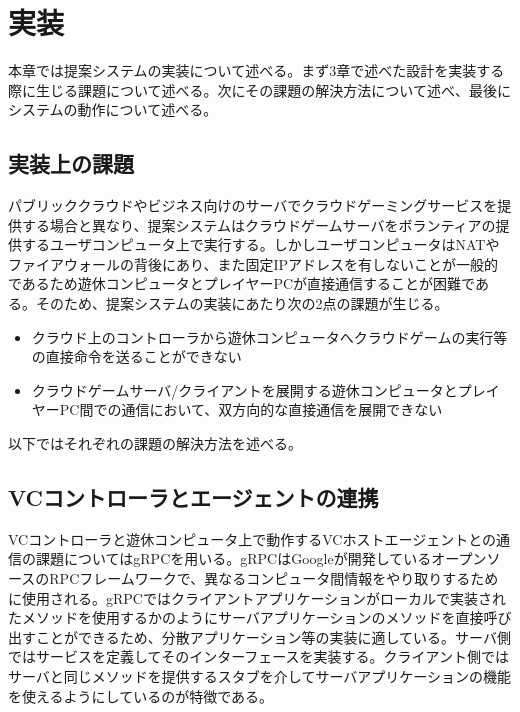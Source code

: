 \section{実装}
本章では提案システムの実装について述べる。まず3章で述べた設計を実装する際に生じる課題について述べる。次にその課題の解決方法について述べ、最後にシステムの動作について述べる。


\subsection{実装上の課題}
パブリッククラウドやビジネス向けのサーバでクラウドゲーミングサービスを提供する場合と異なり、提案システムはクラウドゲームサーバをボランティアの提供するユーザコンピュータ上で実行する。しかしユーザコンピュータはNATやファイアウォールの背後にあり、また固定IPアドレスを有しないことが一般的であるため遊休コンピュータとプレイヤーPCが直接通信することが困難である。そのため、提案システムの実装にあたり次の2点の課題が生じる。
\begin{itemize}
    \item クラウド上のコントローラから遊休コンピュータへクラウドゲームの実行等の直接命令を送ることができない
    \item クラウドゲームサーバ/クライアントを展開する遊休コンピュータとプレイヤーPC間での通信において、双方向的な直接通信を展開できない
\end{itemize}
以下ではそれぞれの課題の解決方法を述べる。

\subsection{VCコントローラとエージェントの連携}
VCコントローラと遊休コンピュータ上で動作するVCホストエージェントとの通信の課題についてはgRPC\cite{grpc}を用いる。gRPCはGoogleが開発しているオープンソースのRPCフレームワークで、異なるコンピュータ間情報をやり取りするために使用される。gRPCではクライアントアプリケーションがローカルで実装されたメソッドを使用するかのようにサーバアプリケーションのメソッドを直接呼び出すことができるため、分散アプリケーション等の実装に適している。サーバ側ではサービスを定義してそのインターフェースを実装する。クライアント側ではサーバと同じメソッドを提供するスタブを介してサーバアプリケーションの機能を使えるようにしているのが特徴である。

